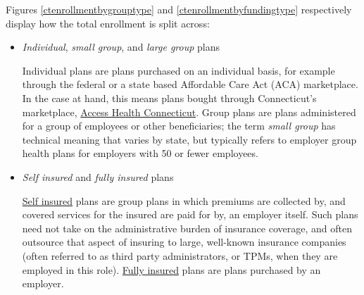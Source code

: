 \documentclass[12pt, a4paper,twoside]{report}
\theoremstyle{plain} %
\theoremstyle{definition} %
\theoremstyle{remark} %
\numberwithin{equation}{chapter}
\begin{document}
		Figures \ref{ctenrollmentbygrouptype} and \ref{ctenrollmentbyfundingtype} respectively display how the total enrollment is split across:
		
		\begin{itemize}
			\item \emph{Individual}, \emph{small group}, and \emph{large group} plans
			
			Individual plans are plans purchased on an individual basis, for example through the federal or a state based Affordable Care Act (ACA) marketplace. In the case at hand, this means plans bought through Connecticut's marketplace, \href{https://www.accesshealthct.com}{Access Health Connecticut}. Group plans are plans administered for a group of employees or other beneficiaries; the term \emph{small group} has technical meaning that varies by state, but typically refers to employer group health plans for employers with 50 or fewer employees.
			
			\item \emph{Self insured} and \emph{fully insured} plans
			
			\href{https://www.healthcare.gov/glossary/self-insured-plan/}{Self insured} plans are group plans in which premiums are collected by, and covered services for the insured are paid for by, an employer itself. Such plans need not take on the administrative burden of insurance coverage, and often outsource that aspect of insuring to large, well-known insurance companies (often referred to as third party administrators, or TPMs, when they are employed in this role). \href{https://www.healthcare.gov/glossary/fully-insured-job-based-plan/}{Fully insured} plans are plans purchased by an employer.
		\end{itemize}
	
\end{document}
